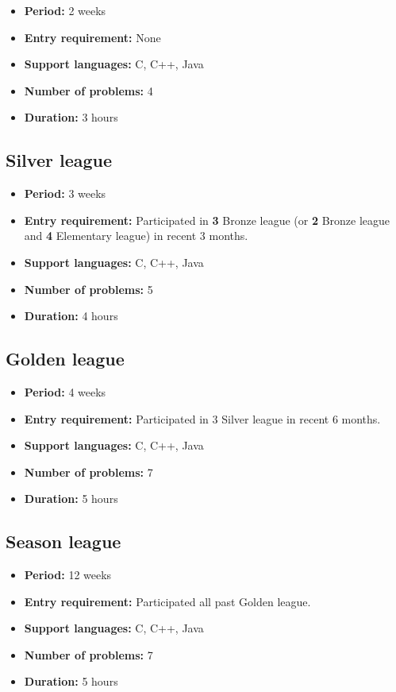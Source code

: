 \documentclass{article}
\begin{document}
\begin{itemize}
	\item \textbf{Period:} 2 weeks
	\item \textbf{Entry requirement:} None
	\item \textbf{Support languages:} C, C++, Java
	\item \textbf{Number of problems:} 4
	\item \textbf{Duration:} 3 hours
\end{itemize}

\subsection{Silver league}

\begin{itemize}
	\item \textbf{Period:} 3 weeks
	\item \textbf{Entry requirement:} Participated in \textbf{3} Bronze league (or \textbf{2} Bronze league and \textbf{4} Elementary league) in recent 3 months.
	\item \textbf{Support languages:} C, C++, Java
	\item \textbf{Number of problems:} 5
	\item \textbf{Duration:} 4 hours
\end{itemize}

\subsection{Golden league}

\begin{itemize}
	\item \textbf{Period:} 4 weeks
	\item \textbf{Entry requirement:} Participated in 3 Silver league in recent 6 months.
	\item \textbf{Support languages:} C, C++, Java
	\item \textbf{Number of problems:} 7
	\item \textbf{Duration:} 5 hours
\end{itemize}

\subsection{Season league}

\begin{itemize}
	\item \textbf{Period:} 12 weeks
	\item \textbf{Entry requirement:} Participated all past Golden league.
	\item \textbf{Support languages:} C, C++, Java
	\item \textbf{Number of problems:} 7
	\item \textbf{Duration:} 5 hours
\end{itemize}
\end{document}
